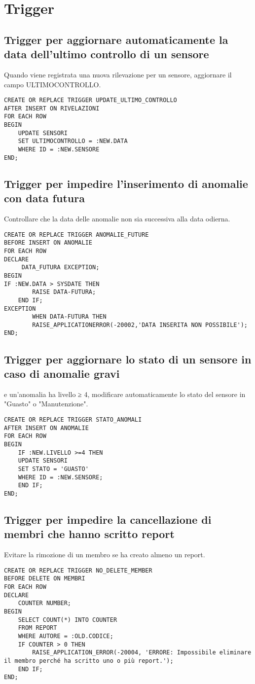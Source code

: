 \section{Trigger}
\subsection{Trigger per aggiornare automaticamente la data dell'ultimo controllo di un sensore}
Quando viene registrata una nuova rilevazione per un sensore, aggiornare il campo ULTIMOCONTROLLO.
\begin{verbatim}
CREATE OR REPLACE TRIGGER UPDATE_ULTIMO_CONTROLLO
AFTER INSERT ON RIVELAZIONI
FOR EACH ROW
BEGIN
    UPDATE SENSORI
    SET ULTIMOCONTROLLO = :NEW.DATA
    WHERE ID = :NEW.SENSORE
END;
\end{verbatim}
\subsection{Trigger per impedire l'inserimento di anomalie con data futura}
Controllare che la data delle anomalie non sia successiva alla data odierna.
\begin{verbatim}
CREATE OR REPLACE TRIGGER ANOMALIE_FUTURE
BEFORE INSERT ON ANOMALIE
FOR EACH ROW
DECLARE 
     DATA_FUTURA EXCEPTION;
BEGIN 
IF :NEW.DATA > SYSDATE THEN
        RAISE DATA-FUTURA;
    END IF;    
EXCEPTION 
        WHEN DATA-FUTURA THEN 
        RAISE_APPLICATIONERROR(-20002,'DATA INSERITA NON POSSIBILE');
END;
\end{verbatim}
\subsection{Trigger per aggiornare lo stato di un sensore in caso di anomalie gravi}
e un'anomalia ha livello ≥ 4, modificare automaticamente lo stato del sensore in "Guasto" o "Manutenzione".
\begin{verbatim}
CREATE OR REPLACE TRIGGER STATO_ANOMALI
AFTER INSERT ON ANOMALIE
FOR EACH ROW
BEGIN
    IF :NEW.LIVELLO >=4 THEN
    UPDATE SENSORI
    SET STATO = 'GUASTO'
    WHERE ID = :NEW.SENSORE;
    END IF;
END;
\end{verbatim}
\subsection{Trigger per impedire la cancellazione di membri che hanno scritto report}
Evitare la rimozione di un membro se ha creato almeno un report.
\begin{verbatim}
CREATE OR REPLACE TRIGGER NO_DELETE_MEMBER
BEFORE DELETE ON MEMBRI
FOR EACH ROW
DECLARE
    COUNTER NUMBER;
BEGIN
    SELECT COUNT(*) INTO COUNTER
    FROM REPORT
    WHERE AUTORE = :OLD.CODICE;
    IF COUNTER > 0 THEN
        RAISE_APPLICATION_ERROR(-20004, 'ERRORE: Impossibile eliminare il membro perché ha scritto uno o più report.');
    END IF;
END;
\end{verbatim}
